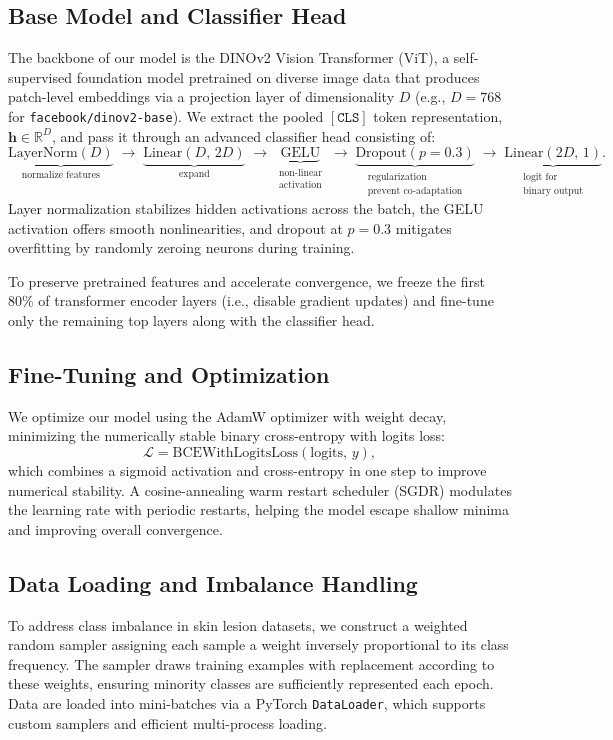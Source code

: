 \subsection{Base Model and Classifier Head}
The backbone of our model is the DINOv2 Vision Transformer (ViT), a self-supervised foundation model pretrained on diverse image data that produces patch-level embeddings via a projection layer of dimensionality \(D\) (e.g., \(D = 768\) for \texttt{facebook/dinov2-base}).  We extract the pooled \([\mathtt{CLS}]\) token representation, \(\mathbf{h}\in\mathbb{R}^D\), and pass it through an advanced classifier head consisting of:
\[
\underbrace{\mathrm{LayerNorm}(D)}_{\text{normalize features}} \;\to\;
\underbrace{\mathrm{Linear}(D,\,2D)}_{\text{expand}} \;\to\;
\underbrace{\mathrm{GELU}}_{\substack{\text{non-linear}\\\text{activation}}}
\;\to\;
\underbrace{\mathrm{Dropout}(p=0.3)}_{\substack{\text{regularization}\\\text{prevent co-adaptation}}}
\;\to\;
\underbrace{\mathrm{Linear}(2D,\,1)}_{\substack{\text{logit for}\\\text{binary output}}}.
\] 
Layer normalization stabilizes hidden activations across the batch, the GELU activation offers smooth nonlinearities, and dropout at \(p=0.3\) mitigates overfitting by randomly zeroing neurons during training.

To preserve pretrained features and accelerate convergence, we freeze the first 80\% of transformer encoder layers (i.e., disable gradient updates) and fine-tune only the remaining top layers along with the classifier head.

\subsection{Fine-Tuning and Optimization}
We optimize our model using the AdamW optimizer with weight decay, minimizing the numerically stable binary cross-entropy with logits loss:
\[
\mathcal{L} = \mathrm{BCEWithLogitsLoss}(\mathrm{logits},\,y),
\]
which combines a sigmoid activation and cross-entropy in one step to improve numerical stability. A cosine-annealing warm restart scheduler (SGDR) modulates the learning rate with periodic restarts, helping the model escape shallow minima and improving overall convergence.

\subsection{Data Loading and Imbalance Handling}
To address class imbalance in skin lesion datasets, we construct a weighted random sampler assigning each sample a weight inversely proportional to its class frequency. The sampler draws training examples with replacement according to these weights, ensuring minority classes are sufficiently represented each epoch. Data are loaded into mini-batches via a PyTorch \texttt{DataLoader}, which supports custom samplers and efficient multi-process loading.

